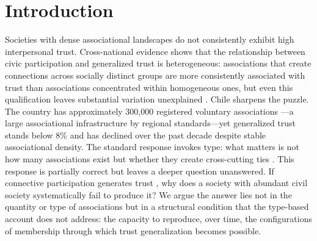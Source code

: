 \section{Introduction}

Societies with dense associational landscapes do not consistently exhibit high interpersonal trust. Cross-national evidence shows that the relationship between civic participation and generalized trust is heterogeneous: associations that create connections across socially distinct groups are more consistently associated with trust than associations concentrated within homogeneous ones, but even this qualification leaves substantial variation unexplained \parencite{paxton_social_2002, paxton_association_2007, stolle1998all}. Chile sharpens the puzzle. The country has approximately 300,000 registered voluntary associations \parencite{irarrazaval_chile_2017}---a large associational infrastructure by regional standards---yet generalized trust stands below 8\% and has declined over the past decade despite stable associational density. The standard response invokes type: what matters is not how many associations exist but whether they create cross-cutting ties \parencite{putnam_bowling_2000, coleman_social_1988}. This response is partially correct but leaves a deeper question unanswered. If connective participation generates trust \parencite{paxton_association_2007}, why does a society with abundant civil society systematically fail to produce it? We argue the answer lies not in the quantity or type of associations but in a structural condition that the type-based account does not address: the capacity to reproduce, over time, the configurations of membership through which trust generalization becomes possible.

